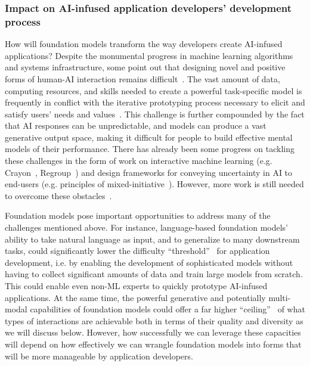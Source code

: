 \subsubsection{Impact on AI-infused application developers' development process} How will foundation models transform the way developers create AI-infused applications? Despite the monumental progress in machine learning algorithms and systems infrastructure, some point out that designing novel and positive forms of human-AI interaction remains  difficult~\citep{Dove2017uxdesign, Cooper2014face}. The vast amount of data, computing resources, and skills needed to create a powerful task-specific model is frequently in conflict with the iterative prototyping process necessary to elicit and satisfy users' needs and values~\citep{Yang2016wireframing}. This challenge is further compounded by the fact that AI responses can be unpredictable, and models can produce a vast generative output space, making it difficult for people to build effective mental models of their performance. There has already been some progress on tackling these challenges in the form of work on interactive machine learning (e.g. Crayon~\citep{Fails2003design}, Regroup~\citep{Amershi2012regroup}) and design frameworks for conveying uncertainty in AI to end-users (e.g. principles of mixed-initiative~\citep{Horvitz1999mixedinit}). However, more work is still needed to overcome these obstacles~\citep{yang2020aiexamine}.

Foundation models pose important opportunities to address many of the challenges mentioned above. For instance, language-based foundation models' ability to take natural language as input, and to generalize to many downstream tasks, could significantly lower the difficulty ``threshold''~\citep{Myers2000ui} for application development, i.e. by enabling the development of sophisticated models without having to collect significant amounts of data and train large models from scratch. This could enable even non-ML experts to quickly prototype AI-infused applications. At the same time, the powerful generative and potentially multi-modal capabilities of foundation models could offer a far higher ``ceiling''~\citep{Myers2000ui} of what types of interactions are achievable both in terms of their quality and diversity as we will discuss below. However, how successfully we can leverage these capacities will depend on how effectively we can wrangle foundation models into forms that will be more manageable by application developers.

